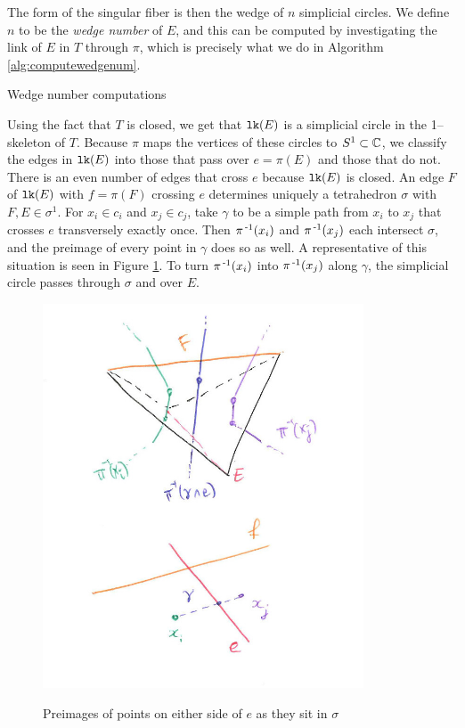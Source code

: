 The form of the singular fiber is then the wedge of $n$ simplicial circles.
We define $n$ to be the \emph{wedge number} of $E$, and this can be computed by investigating the link of $E$ in $T$ through $\pi$, which is precisely what we do in Algorithm \ref{alg:computewedgenum}.

\begin{algorithm}
	\caption{Wedge number computations}
	\label{alg:computewedgenum}
\end{algorithm}

Using the fact that $T$ is closed, we get that $\texttt{lk}(E)$ is a simplicial circle in the 1--skeleton of $T$.
Because $\pi$ maps the vertices of these circles to $S^1\subset\mathbb{C}$, we classify the edges in $\texttt{lk}(E)$ into those that pass over $e=\pi(E)$ and those that do not.
There is an even number of edges that cross $e$ because $\texttt{lk}(E)$ is closed.
An edge $F$ of $\texttt{lk}(E)$ with $f=\pi(F)$ crossing $e$ determines uniquely a tetrahedron $\sigma$ with $F,E\in\sigma^1$.
For $x_i\in c_i$ and $x_j\in c_j$, take $\gamma$ to be a simple path from $x_i$ to $x_j$ that crosses $e$ transversely exactly once.
Then $\pi^{\,\text{-}1}(x_i)$ and $\pi^{\,\text{-}1}(x_j)$ each intersect $\sigma$, and the preimage of every point in $\gamma$ does so as well.
A representative of this situation is seen in Figure \ref{fig:gammapullback}.
To turn $\pi^{\,\text{-}1}(x_i)$ into $\pi^{\,\text{-}1}(x_j)$ along $\gamma$, the simplicial circle passes through $\sigma$ and over $E$.

\begin{figure}
	\centering
	\captionsetup{justification=centering}
	\caption{Preimages of points on either side of $e$ as they sit in $\sigma$}
	\includegraphics[width=3.75in]{figures/gammapullback.jpg}
	\label{fig:gammapullback}
\end{figure}

